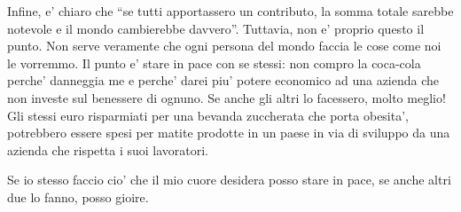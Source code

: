 Infine, e' chiaro che ``se tutti apportassero un contributo, la somma totale sarebbe notevole e il mondo cambierebbe davvero''. Tuttavia, non e' proprio questo il punto. Non serve veramente che ogni persona del mondo faccia le cose come noi le vorremmo. Il punto e' stare in pace con se stessi: non compro la coca-cola perche' danneggia me e perche' darei piu' potere economico ad una azienda che non investe sul benessere di ognuno. Se anche gli altri lo facessero, molto meglio! Gli stessi euro risparmiati per una bevanda zuccherata che porta obesita', potrebbero essere spesi per matite prodotte in un paese in via di sviluppo da una azienda che rispetta i suoi lavoratori.

Se io stesso faccio cio' che il mio cuore desidera posso stare in pace, se anche altri due lo fanno, posso gioire.
